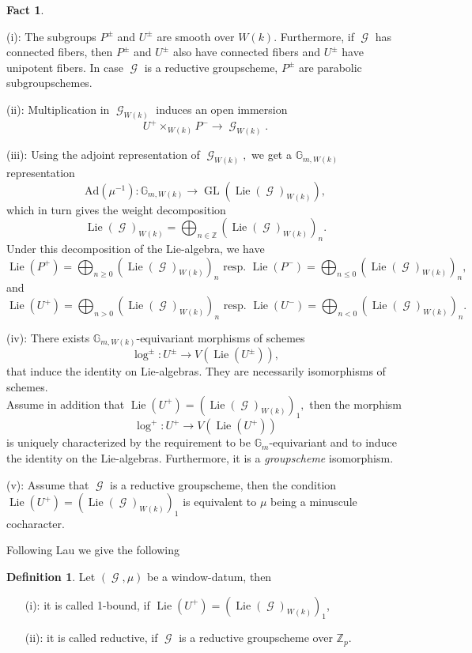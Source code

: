 \documentclass[a4paper,10,5 pt]{amsart}
\theoremstyle{definition}
\newtheorem{Definition}{Definition}
\newtheorem{Fact}[Satz]{Fact}
\DeclareMathOperator{\Lie}{Lie}
\DeclareMathOperator{\GL}{GL}
\DeclareMathOperator{\G}{\mathcal{G}}
\begin{document}
\begin{Fact}\label{Zusammenfassung zu Gewichtsgruppen}
\item[(i):] The subgroups $P^{\pm}$ and $U^{\pm}$ are smooth over $W(k).$ Furthermore, if $\G$ has connected fibers, then $P^{\pm}$ and $U^{\pm}$ also have connected fibers and $U^{\pm}$ have unipotent fibers. In case $\G$ is a reductive groupscheme, $P^{\pm}$ are parabolic subgroupschemes. 
\item[(ii):] Multiplication in $\G_{W(k)}$ induces an open immersion
$$U^{+} \times_{W(k)} P^{-} \rightarrow \G_{W(k)}.$$
\item[(iii):] Using the adjoint representation of $\G_{W(k)},$ we get a $\mathbb{G}_{m,W(k)}$ representation
$$\text{Ad}(\mu^{-1})\colon \mathbb{G}_{m,W(k)} \rightarrow \GL(\Lie(\G)_{W(k)}),$$
which in turn gives the weight decomposition
$$\Lie(\G)_{W(k)}=\bigoplus_{n\in \mathbb{Z}} (\Lie(\G)_{W(k)})_{n}.$$
Under this decomposition of the Lie-algebra, we have
$$
 \Lie(P^{+})= \bigoplus_{n\geq 0} (\Lie(\G)_{W(k)})_{n} \text{ resp. } \Lie(P^{-})= \bigoplus_{n\leq 0} (\Lie(\G)_{W(k)})_{n},
$$
and
$$
\Lie(U^{+})= \bigoplus_{n > 0} (\Lie(\G)_{W(k)})_{n} \text{ resp. } \Lie(U^{-})= \bigoplus_{n < 0} (\Lie(\G)_{W(k)})_{n}.
$$
\item[(iv):] There exists $\mathbb{G}_{m,W(k)}$-equivariant morphisms of schemes
$$ \log^{\pm}\colon U^{\pm}\rightarrow V(\Lie(U^{\pm})),$$
that induce the identity on Lie-algebras. They are necessarily isomorphisms of schemes.
\\
Assume in addition that $\Lie(U^{+})=(\Lie(\G)_{W(k)})_{1},$ then the morphism
$$ \log^{+}\colon U^{+}\rightarrow V(\Lie(U^{+}))$$
is uniquely characterized by the requirement to be $\mathbb{G}_{m}$-equivariant and to induce the identity on the Lie-algebras. Furthermore, it is a \textit{groupscheme} isomorphism.
\item[(v):] Assume that $\G$ is a reductive groupscheme, then the condition $\Lie(U^{+})=(\Lie(\G)_{W(k)})_{1}$ is equivalent to $\mu$ being a minuscule cocharacter.
\end{Fact}
Following Lau we give the following
\begin{Definition} Let $(\G,\mu)$ be a window-datum, then
\begin{enumerate}
\item[(i):] it is called 1-bound, if
$
\Lie(U^{+})=(\Lie(\G)_{W(k)})_{1}
$,
\item[(ii):] it is called reductive, if $\G$ is a reductive groupscheme over $\mathbb{Z}_{p}.$
\end{enumerate}
\end{Definition}
\end{document}
